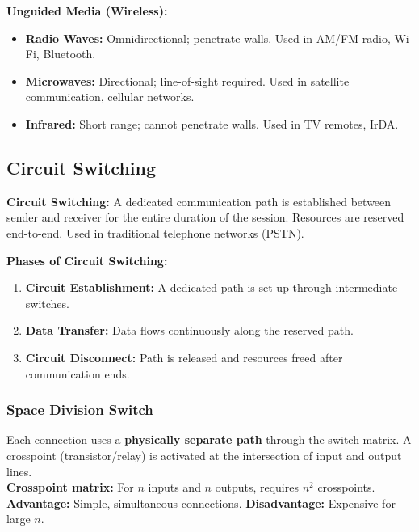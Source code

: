 \documentclass[12pt,a4paper]{article}
\begin{document}
\textbf{Unguided Media (Wireless):}
\begin{itemize}[leftmargin=*, itemsep=3pt]
  \item \textbf{Radio Waves:} Omnidirectional; penetrate walls. Used in AM/FM radio, Wi-Fi, Bluetooth.
  \item \textbf{Microwaves:} Directional; line-of-sight required. Used in satellite communication, cellular networks.
  \item \textbf{Infrared:} Short range; cannot penetrate walls. Used in TV remotes, IrDA.
\end{itemize}

\subsection{Circuit Switching}

\begin{tcolorbox}[defbox]
\textbf{Circuit Switching:} A dedicated communication path is established between sender and receiver for the entire duration of the session. Resources are reserved end-to-end. Used in traditional telephone networks (PSTN).
\end{tcolorbox}

\textbf{Phases of Circuit Switching:}
\begin{enumerate}[label=\textbf{\arabic*.}, leftmargin=*, itemsep=3pt]
  \item \textbf{Circuit Establishment:} A dedicated path is set up through intermediate switches.
  \item \textbf{Data Transfer:} Data flows continuously along the reserved path.
  \item \textbf{Circuit Disconnect:} Path is released and resources freed after communication ends.
\end{enumerate}

\subsubsection*{Space Division Switch}

\begin{tcolorbox}[formulabox, title={\textbf{Space Division Switching}}]
Each connection uses a \textbf{physically separate path} through the switch matrix. A crosspoint (transistor/relay) is activated at the intersection of input and output lines.\\[4pt]
\textbf{Crosspoint matrix:} For $n$ inputs and $n$ outputs, requires $n^2$ crosspoints.\\
\textbf{Advantage:} Simple, simultaneous connections. \textbf{Disadvantage:} Expensive for large $n$.
\end{tcolorbox}
\end{document}
